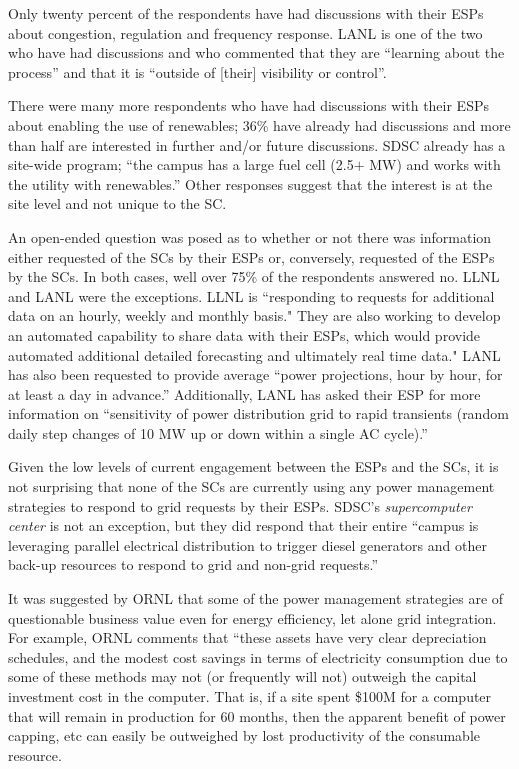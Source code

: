Only twenty percent of the respondents have had discussions with their
ESPs about congestion, regulation and frequency
response. LANL is one of the two who have had discussions and who commented that
they are ``learning about the process'' and that it is ``outside of [their] visibility or control''.

There were many more respondents who have had discussions with their
ESPs about enabling the use of renewables; 36{\%}
have already had discussions and more than half are interested in further
and/or future discussions. SDSC already has a site-wide program; ``the
campus has a large fuel cell (2.5$+$ MW) and works with the utility with
renewables.'' Other responses suggest that the interest is at the site level
and not unique to the SC.

An open-ended question was posed as to whether or not there was information
either requested of the SCs by their ESPs or,
conversely, requested of the ESPs by the SCs. In both cases, well
over 75{\%} of the respondents answered no. LLNL and LANL were the
exceptions. LLNL is ``responding to requests for additional data on an hourly, 
weekly and monthly basis." They are also working to develop an automated capability to share 
data with their ESPs, which would provide automated additional 
detailed forecasting and ultimately real time data."
LANL has also been requested to provide average ``power projections, hour by hour,
for at least a day in advance.'' Additionally, LANL has asked their ESP for
more information on ``sensitivity of power distribution grid to rapid
transients (random daily step changes of 10 MW up or down within a single AC
cycle).''

Given the low levels of current engagement between the ESPs and the SCs, it is not surprising that none of
the SCs are currently using any power management
strategies to respond to grid requests by their ESPs. SDSC's \textit{supercomputer center} is not an exception, but they did respond that their
entire ``campus is leveraging parallel electrical distribution to trigger
diesel generators and other back-up resources to respond to grid and
non-grid requests.''

It was suggested by ORNL that some of the power management strategies 
are of questionable business value even for energy efficiency, let alone grid integration.
For example, ORNL comments that ``these assets have very clear depreciation schedules, and the modest cost 
savings in terms of electricity consumption due to some of these methods may not (or frequently will not) 
outweigh the capital investment cost in the computer. That is, if a site spent \$100M for a computer that will 
remain in production for 60 months, then the 
apparent benefit of power capping, etc can easily be outweighed by lost productivity of the consumable resource.

